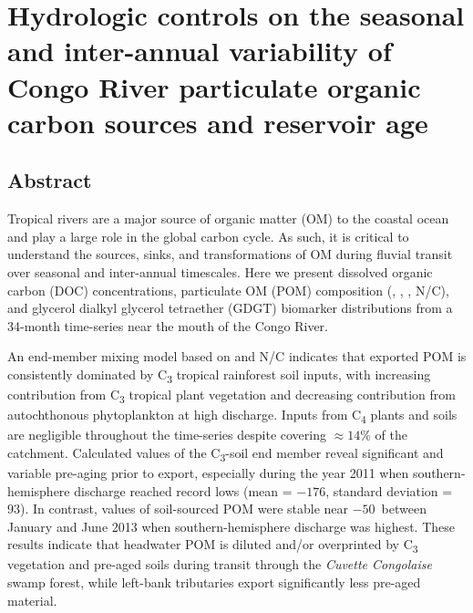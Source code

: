 \chapter{Hydrologic controls on the seasonal and inter-annual variability of Congo River particulate organic carbon sources and reservoir age}
\label{Ch5}
\raggedbottom

{\let\thefootnote\relax{}}

\clearpage

\section{Abstract}

Tropical rivers are a major source of organic matter (OM) to the coastal ocean and play a large role in the global carbon cycle. As such, it is critical to understand the sources, sinks, and transformations of OM during fluvial transit over seasonal and inter-annual timescales. Here we present dissolved organic carbon (DOC) concentrations, particulate OM (POM) composition (, , , N/C), and glycerol dialkyl glycerol tetraether (GDGT) biomarker distributions from a 34-month time-series near the mouth of the Congo River.

An end-member mixing model based on  and N/C indicates that exported POM is consistently dominated by C\textsubscript{3} tropical rainforest soil inputs, with increasing contribution from C\textsubscript{3} tropical plant vegetation and decreasing contribution from autochthonous phytoplankton at high discharge. Inputs from C\textsubscript{4} plants and soils are negligible throughout the time-series despite covering $\approx 14$\% of the catchment. Calculated  values of the C\textsubscript{3}-soil end member reveal significant and variable pre-aging prior to export, especially during the year 2011 when southern-hemisphere discharge reached record lows (mean  = $-176$\textperthousand, standard deviation = $93$\textperthousand). In contrast,  values of soil-sourced POM were stable near $-50$\textperthousand\ between January and June 2013 when southern-hemisphere discharge was highest. These results indicate that headwater POM is diluted and/or overprinted by C\textsubscript{3} vegetation and pre-aged soils during transit through the \textit{Cuvette Congolaise} swamp forest, while left-bank tributaries export significantly less pre-aged material.

